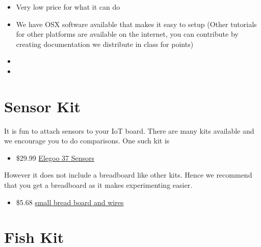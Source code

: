 \begin{itemize}
\item
  Very low price for what it can do
\item
  We have OSX software available that makes it easy to setup (Other
  tutorials for other platforms are available on the internet, you can
  contribute by creating documentation we distribute in class for
  points)
\item
\item
\end{itemize}

\section{Sensor Kit}\label{sensor-kit}

It is fun to attach sensors to your IoT board. There are many kits
available and we encourage you to do comparisons. One such kit is

\begin{itemize}

\item
  \$29.99
  \href{https://www.amazon.com/Elegoo-Upgraded-Modules-Tutorial-Arduino/dp/B01MG49ZQ5/ref=sr_1_7?s=electronics\&ie=UTF8\&qid=1499251441\&sr=1-7\&keywords=elegoo}{Elegoo
  37 Sensors}
\end{itemize}

However it does not include a breadboard like other kits. Hence we
recommend that you get a breadboard as it makes experimenting easier.

\begin{itemize}

\item
  \$5.68
  \href{https://www.amazon.com/Elegoo-Premium-Female-tie-points-breadboard/dp/B06XB8TZVC/ref=sr_1_23?s=electronics\&ie=UTF8\&qid=1499251600\&sr=1-23\&keywords=elegoo}{small
  bread board and wires}
\end{itemize}

\section{Fish Kit}\label{fish-kit}

